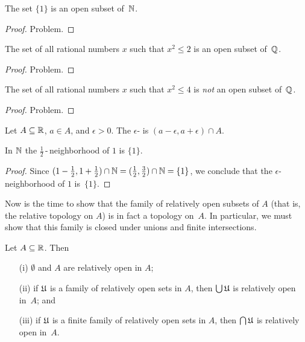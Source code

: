 \begin{exam} The set $\{1\}$ is an open subset of~$\mathbb{N}$.
\end{exam}

\begin{proof} Problem.  \ns \end{proof}

\begin{exam} The set of all rational numbers $x$ such that $x^2 \le 2$ is an open subset of~$\mathbb{Q}$.
\end{exam}

\begin{proof} Problem.  \ns \end{proof}

\begin{exam} The set of all rational numbers $x$ such that $x^2 \le 4$ is \emph{not} an
open subset of~$\mathbb{Q}$.
\end{exam}

\begin{proof} Problem.  \ns \end{proof}

\begin{defn} Let $A \subseteq \mathbb{R}$, $a \in A$, and $\epsilon > 0$.  The
$\epsilon$- is $(a-\epsilon, a+\epsilon) \cap A$.
\end{defn}

\begin{exam} In $\mathbb{N}$ the $\frac12$\,-\,neighborhood of $1$ is $\{1\}$.
\end{exam}

\begin{proof} Since $(1-\frac12, 1+\frac12) \cap \mathbb{N} = (\frac12, \frac32) \cap \mathbb{N} = \{1\}$,
we conclude that the $\epsilon$-neighborhood of $1$ is~$\{1\}$.
\end{proof}

Now is the time to show that the family of relatively open subsets of $A$ (that is, the
relative topology on $A$) is in fact a topology on~$A$.  In particular, we must show that this
family is closed under unions and finite intersections.

\begin{prop} Let $A \subseteq \mathbb{R}$.  Then
 \begin{enumerate}
  \item[(i)] $\emptyset$ and $A$ are relatively open in $A$;
  \item[(ii)] if $\mathfrak{U}$ is a family of relatively open sets in $A$, then $\bigcup\mathfrak{U}$
is relatively open in~$A$; and
  \item[(iii)] if $\mathfrak{U}$ is a finite family of relatively open sets in $A$, then
$\bigcap\mathfrak{U}$ is relatively open in~$A$.
 \end{enumerate}
\end{prop}

